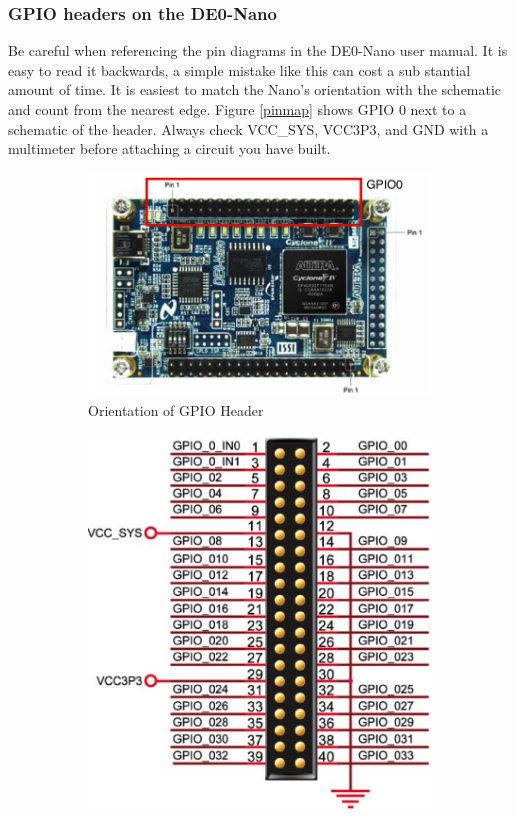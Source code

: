       \subsubsection{GPIO headers on the DE0-Nano} 
        Be careful when referencing the pin diagrams in the DE0-Nano user manual. It is easy to read it backwards, a simple mistake like this can cost a sub stantial amount of time. It is easiest to match the Nano's orientation with the schematic and count from the nearest edge. Figure \ref{pinmap} shows GPIO 0 next to a schematic of the header. Always check VCC\_SYS, VCC3P3, and GND with a multimeter before attaching a circuit you have built.        
        \begin{figure}
          \centering
          \begin{subfigure}[b]{.38\textwidth}
            \includegraphics[angle=270, width=.9\textwidth]{Images/LabeledGPIOHeaders.jpg}
            \caption{Orientation of GPIO Header\cite{DE0Manual}}
          \end{subfigure}
          \begin{subfigure}[b]{.45\textwidth}
            \includegraphics[width=\textwidth]{Images/GPIOHeader.jpg}

\end{subfigure}
\end{figure}
